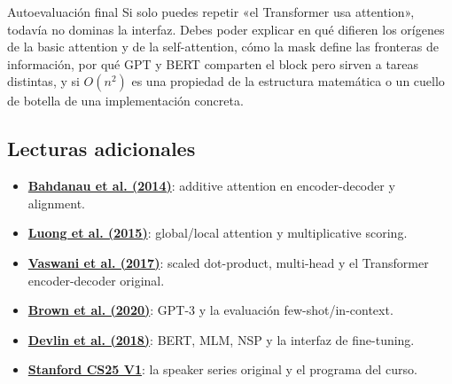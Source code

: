 \documentclass[a4paper]{article}
\begin{document}
\begin{warningbox}{Autoevaluación final}
Si solo puedes repetir «el Transformer usa attention», todavía no dominas la interfaz. Debes poder explicar en qué difieren los orígenes de la basic attention y de la self-attention, cómo la mask define las fronteras de información, por qué GPT y BERT comparten el block pero sirven a tareas distintas, y si $O(n^2)$ es una propiedad de la estructura matemática o un cuello de botella de una implementación concreta.
\end{warningbox}

\subsection{Lecturas adicionales}

{\small
\begin{itemize}[nosep,leftmargin=*]
  \item \href{https://arxiv.org/abs/1409.0473}{\textbf{Bahdanau et al. (2014)}}: additive attention en encoder-decoder y alignment.
  \item \href{https://arxiv.org/abs/1508.04025}{\textbf{Luong et al. (2015)}}: global/local attention y multiplicative scoring.
  \item \href{https://arxiv.org/abs/1706.03762}{\textbf{Vaswani et al. (2017)}}: scaled dot-product, multi-head y el Transformer encoder-decoder original.
  \item \href{https://arxiv.org/abs/2005.14165}{\textbf{Brown et al. (2020)}}: GPT-3 y la evaluación few-shot/in-context.
  \item \href{https://arxiv.org/abs/1810.04805}{\textbf{Devlin et al. (2018)}}: BERT, MLM, NSP y la interfaz de fine-tuning.
  \item \href{https://web.stanford.edu/class/cs25/past/cs25-v1/}{\textbf{Stanford CS25 V1}}: la speaker series original y el programa del curso.
\end{itemize}
}
\end{document}
